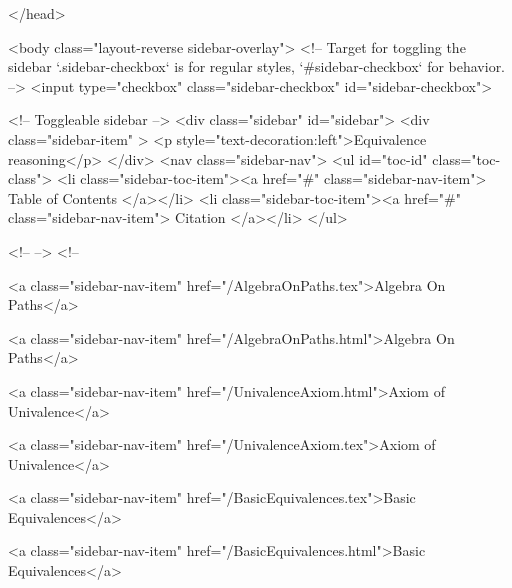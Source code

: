  
</head>




  <body class="layout-reverse sidebar-overlay">
    <!-- Target for toggling the sidebar `.sidebar-checkbox` is for regular
     styles, `#sidebar-checkbox` for behavior. -->
<input type="checkbox" class="sidebar-checkbox" id="sidebar-checkbox">

<!-- Toggleable sidebar -->
<div class="sidebar" id="sidebar">
  <div class="sidebar-item" >
    <p style="text-decoration:left">Equivalence reasoning</p>
  </div>
  <nav class="sidebar-nav">
    <ul id="toc-id" class="toc-class">
  <li class="sidebar-toc-item"><a href="#" class="sidebar-nav-item"> Table of Contents </a></li>
  <li class="sidebar-toc-item"><a href="#" class="sidebar-nav-item"> Citation </a></li>
</ul>


    <!--  -->
    <!-- 
      
    
      
    
      
    
      
    
      
        
      
    
      
        
          <a class="sidebar-nav-item" href="/AlgebraOnPaths.tex">Algebra On Paths</a>
        
      
    
      
        
          <a class="sidebar-nav-item" href="/AlgebraOnPaths.html">Algebra On Paths</a>
        
      
    
      
        
          <a class="sidebar-nav-item" href="/UnivalenceAxiom.html">Axiom of Univalence</a>
        
      
    
      
        
          <a class="sidebar-nav-item" href="/UnivalenceAxiom.tex">Axiom of Univalence</a>
        
      
    
      
        
          <a class="sidebar-nav-item" href="/BasicEquivalences.tex">Basic Equivalences</a>
        
      
    
      
        
          <a class="sidebar-nav-item" href="/BasicEquivalences.html">Basic Equivalences</a>
        
